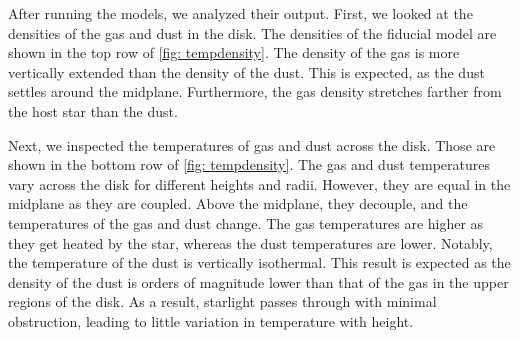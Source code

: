 \documentclass[twoside, single, authoryear, semicolon, 12pt]{lion-msc}
\newcommand{\4}{$_4$}
\newcommand{\3}{$_3$}
\newcommand{\2}{$_2$}
\begin{document}
After running the models, we analyzed their output. First, we looked at the densities of the gas and dust in the disk. The densities of the fiducial model are shown in the top row of \autoref{fig: tempdensity}. The density of the gas is more vertically extended than the density of the dust. This is expected, as the dust settles around the midplane. Furthermore, the gas density stretches farther from the host star than the dust. 

Next, we inspected the temperatures of gas and dust across the disk. Those are shown in the bottom row of \autoref{fig: tempdensity}.  The gas and dust temperatures vary across the disk for different heights and radii. However, they are equal in the midplane as they are coupled. Above the midplane, they decouple, and the temperatures of the gas and dust change. The gas temperatures are higher as they get heated by the star, whereas the dust temperatures are lower. Notably, the temperature of the dust is vertically isothermal. This result is expected as the density of the dust is orders of magnitude lower than that of the gas in the upper regions of the disk.  As a result, starlight passes through with minimal obstruction, leading to little variation in temperature with height.

\end{document}
